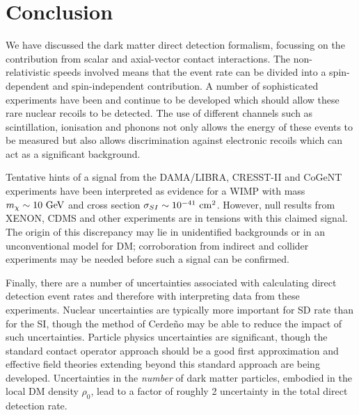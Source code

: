 

 

\section{Conclusion}

We have discussed the dark matter direct detection formalism, focussing on the contribution from scalar and axial-vector contact interactions. The non-relativistic speeds involved means that the event rate can be divided into a spin-dependent and spin-independent contribution. A number of sophisticated experiments have been and continue to be developed which should allow these rare nuclear recoils to be detected. The use of different channels such as scintillation, ionisation and phonons not only allows the energy of these events to be measured but also allows discrimination against electronic recoils which can act as a significant background.

Tentative hints of a signal from the DAMA/LIBRA, CRESST-II and CoGeNT experiments have been interpreted as evidence for a WIMP with mass $m_\chi \sim 10 \textrm{ GeV}$ and cross section $\sigma_{SI} \sim 10^{-41} \textrm{ cm}^2$. However, null results from XENON, CDMS and other experiments are in tensions with this claimed signal. The origin of this discrepancy may lie in unidentified backgrounds or in an unconventional model for DM; corroboration from indirect and collider experiments may be needed before such a signal can be confirmed. 

Finally, there are a number of uncertainties associated with calculating direct detection event rates and therefore with interpreting data from these experiments. Nuclear uncertainties are typically more important for SD rate than for the SI, though the method of Cerde\~{n}o \etal may be able to reduce the impact of such uncertainties. Particle physics uncertainties are significant, though the standard contact operator approach should be a good first approximation and effective field theories extending beyond this standard approach are being developed. Uncertainties in the \textit{number} of dark matter particles, embodied in the local DM density $\rho_0$, lead to a factor of roughly 2 uncertainty in the total direct detection rate. 

